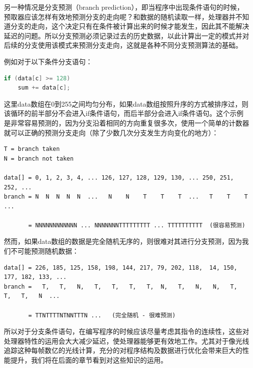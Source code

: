 另一种情况是分支预测（branch prediction），即当程序中出现条件语句的时候，预取器应该怎样有效地预测分支的走向呢？和数据的随机读取一样，处理器并不知道分支的走向，这个决定只有在条件被计算出来的时候才能发生，因此其不能解决延迟的问题。所以分支预测必须记录过去的历史数据，以此计算出一定的模式并对后续的分支使用该模式来预测分支走向，这就是各种不同分支预测算法的基础。

例如对于以下条件分支语句：

\begin{lstlisting}[language=C++,mathescape]
if (data[c] >= 128)
	sum += data[c];
\end{lstlisting}

这里data数组在0到255之间均匀分布，如果data数组按照升序的方式被排序过，则该循环的前半部分不会进入if条件语句，而后半部分会进入if条件语句。这个示例是非常容易预测的，因为分支沿着相同的方向重复很多次，使用一个简单的计数器就可以正确的预测分支走向（除了少数几次分支发生方向变化的地方）：

\begin{fullwidth}
\begin{lstlisting}
T = branch taken
N = branch not taken

data[] = 0, 1, 2, 3, 4, ... 126, 127, 128, 129, 130, ... 250, 251, 252, ...
branch = N  N  N  N  N  ...   N    N    T    T    T  ...   T    T    T  ...

       = NNNNNNNNNNNN ... NNNNNNNTTTTTTTTT ... TTTTTTTTTT  (很容易预测)
\end{lstlisting}
\end{fullwidth}

然而，如果data数组的数据是完全随机无序的，则很难对其进行分支预测，因为我们不可能预测随机数据：

\begin{fullwidth}
\begin{lstlisting}
data[] = 226, 185, 125, 158, 198, 144, 217, 79, 202, 118,  14, 150, 177, 182, 133, ...
branch =   T,   T,   N,   T,   T,   T,   T,  N,   T,   N,   N,   T,   T,   T,   N  ...

       = TTNTTTTNTNNTTTN ...   (完全随机 - 很难预测)
\end{lstlisting}
\end{fullwidth}

所以对于分支条件语句，在编写程序的时候应该尽量考虑其指令的连续性，这些对处理器特性的运用会大大减少延迟，使处理器能够更有效地工作。尤其对于像光线追踪这种每帧数亿的光线计算，充分的对程序结构及数据进行优化会带来巨大的性能提升，我们将在后面的章节看到对这些知识的运用。





